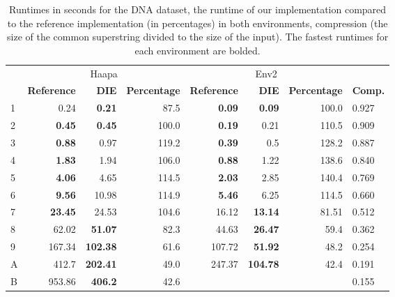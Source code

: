 \documentclass[english,twoside,censored,csm,algorithms-track-2020]{HYthesisML}
\theoremstyle{plain}
\theoremstyle{definition}
\begin{document}
\begin{center}
  \begin{table}[t]
  \hspace{-1cm}
  \begin{tabular} {|l|r r r|r r r|l|}
    \hline
     & \multicolumn{3}{c}{Haapa} & \multicolumn{3}{c}{Env2} & \\
     \textbf{\text{\#}} & \textbf{Reference} & \textbf{DIE} & \textbf{Percentage}  & \textbf{Reference} & \textbf{DIE} & \textbf{Percentage} & \textbf{Comp.} \\
     \hline
     1 & 0.24            & \textbf{0.21}   & 87.5   & \textbf{0.09}  & \textbf{0.09}   & 100.0           & 0.927 \\
     2 & \textbf{0.45}   & \textbf{0.45}   & 100.0  & \textbf{0.19}  & 0.21            & 110.5           & 0.909 \\
     3 & \textbf{0.88}   & 0.97            & 119.2  & \textbf{0.39}  & 0.5             & 128.2           & 0.887 \\
     4 & \textbf{1.83}   & 1.94            & 106.0  & \textbf{0.88}  & 1.22            & 138.6           & 0.840 \\
     5 & \textbf{4.06}   & 4.65            & 114.5  & \textbf{2.03}  & 2.85            & 140.4           & 0.769 \\
     6 & \textbf{9.56}   & 10.98           & 114.9  & \textbf{5.46}  & 6.25            & 114.5           & 0.660 \\
     7 & \textbf{23.45}  & 24.53           & 104.6  & 16.12          & \textbf{13.14}  & 81.51           & 0.512 \\
     8 & 62.02           & \textbf{51.07}  & 82.3   & 44.63          & \textbf{26.47}  & 59.4            & 0.362 \\
     9 & 167.34          & \textbf{102.38} & 61.6   & 107.72         & \textbf{51.92}  & 48.2            & 0.254 \\
     A & 412.7           & \textbf{202.41} & 49.0   & 247.37         & \textbf{104.78} & 42.4            & 0.191 \\
     B & 953.86          & \textbf{406.2}  & 42.6   &                &                 &                 & 0.155 \\
\hline

  \end{tabular}
  \caption{Runtimes in seconds for the DNA dataset, the runtime of our implementation compared to the reference implementation (in percentages) in both environments, compression (the size of the common superstring divided to the size of the input). The fastest runtimes for each environment are bolded.}
  \label{runtimes-dna}
  \end{table}
\end{center}
\end{document}
